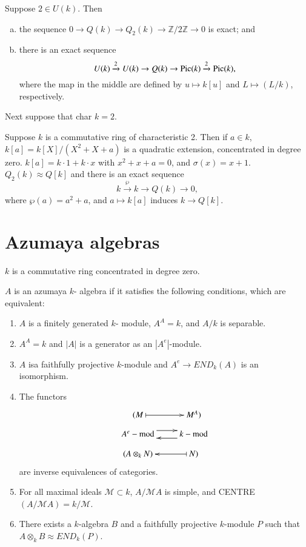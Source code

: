 \begin{prop}%
 Suppose $2 \in U (k)$. Then
\begin{enumerate}[(a)]
\item the sequence $0 \to Q (k) \to Q_2 (k) \to \mathbb{Z}/2
  \mathbb{Z} \to 0$ is exact; and  

\item there is an exact sequence 
$$
U(k) \xrightarrow{2} U(k) \to Q(k) \to \operatorname{Pic} (k) \xrightarrow{2} \operatorname{Pic}
(k), 
$$
where the map in the middle are defined by $u \mapsto k[u]$ and $L
\mapsto (L/k)$, respectively. 
\end{enumerate}
\end{prop}

Next suppose that char $k = 2$.

\begin{prop}%
Suppose $k$ is a commutative ring of characteristic 2. Then if $a
\in k$, $k[a]= k[X]/(X^2 + X+a)$ is a quadratic extension,
concentrated in degree zero. $k[a]=k \cdot 1 + k \cdot x $ with $x^2 + x + a =
0$, and $\sigma (x) = x+1$. $Q_2 (k) \approx Q[k]$ and there is an
exact sequence  
$$
k \xrightarrow{\wp}k \to Q (k) \to 0,
$$
where $\wp (a)=a^2+a$, and $a \mapsto k[a]$ induces $k \to Q[k]$.
\end{prop}


\section{Azumaya algebras}\label{chap4:sec4}%
$k$ is a commutative ring concentrated in degree zero. 

\begin{thmanddef}\label{chap4:thm4.1}%
$A$ is an  azumaya $k$- algebra if it satisfies the
   following conditions, which are equivalent: 
\begin{enumerate}[(1)]
\item $A$ is a finitely generated $k$- module, $A^A= k$, and
  $A/k$ is separable. 

\item $A^A = k$ and  $|A|$ is a generator as an $|A^e|$-module.

\item $A$ is\pageoriginale a faithfully projective $k$-module and $A^e
  \to END_k (A)$ is an isomorphism. 

\item The functors
\[
\xymatrix@R=-1.3cm{
 (A \otimes_k N) &  N \ar@{|->}[l]) \\
 A^e -{\rm mod} \ar@<1ex>[r] &  k-{\rm mod} \ar@<1ex>[l]\\
 (M  \ar@{|->}[r] & M^A )
}
\]
are inverse equivalences of categories.

\item For all maximal ideals $\mathscr{M} \subset k$, $A/
  \mathscr{M} A$ is simple, and CENTRE $ (A/ \mathscr{M} A)= k/
  \mathscr{M}$. 

\item There exists a $k$-algebra $B$ and a faithfully projective
  $k$-module $P$ such that $A \otimes_k B \approx END_k (P)$. 
\end{enumerate}
\end{thmanddef}


